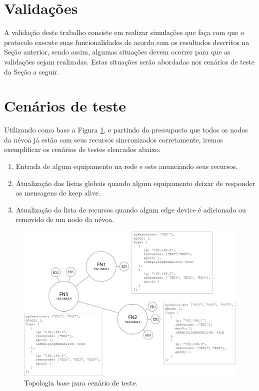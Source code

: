 \section{Validações}

A validação deste trabalho consiste em realizar simulações que faça com que o protocolo execute suas funcionalidades de acordo com os resultados descritos na Seção anterior, sendo assim, 
algumas situações devem ocorrer para que as validações sejam realizadas.
Estas situações serão abordadas nos cenários de teste da Seção a seguir.

\section{Cenários de teste}

Utilizando como base a Figura \ref{fig:fig7}, e partindo do pressuposto que todos os nodos da névoa já estão com seus recursos sincronizados corretamente,
iremos exemplificar os cenários de testes elencados abaixo.

\begin{enumerate}
    \item Entrada de algum equipamento na rede e este anunciando seus recursos. 
    \item Atualização das listas globais quando algum equipamento deixar de responder as mensagens de keep alive.
    \item Atualização da lista de recursos quando algum edge device é adicionado ou removido de um nodo da névoa.
\end{enumerate}

\begin{figure}[htb!]
    \centering\includegraphics[width=.8\textwidth]{fig7.png}
    \caption%
    {\label{fig:fig7} Topologia base para cenário de teste.}
\end{figure}

